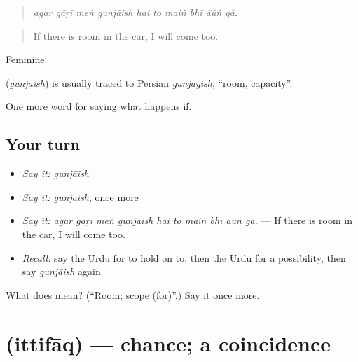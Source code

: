 \begin{quote}
         
\end{quote}

\begin{quote}
\emph{agar gāṛī meṅ gunjāish hai to maiṅ bhī āūṅ gā.}
\end{quote}

\begin{quote}
If there is room in the car, I will come too.
\end{quote}

Feminine.

\begin{cousinweb}
\textbf{} (\emph{gunjāish}) is usually traced to Persian \emph{gunjāyish}, \textquotedblleft{}room, capacity\textquotedblright{}.
\end{cousinweb}

\begin{grammarlens}[title={What you've built}]
One more word for saying what happens if.
\end{grammarlens}

\subsection*{Your turn}
\begin{itemize}
\raggedright
  \item \emph{Say it:} \emph{gunjāish}
  \item \emph{Say it:} \emph{gunjāish}, once more
  \item \emph{Say it:} \emph{agar gāṛī meṅ gunjāish hai to maiṅ bhī āūṅ gā.} — If there is room in the car, I will come too.
  \item \emph{Recall:} say the Urdu for to hold on to, then the Urdu for a possibility, then say \emph{gunjāish} again
\end{itemize}

\begin{tcolorbox}[breakable,colback=teal!4,colframe=teal!35!black,title={Before you move on}]
What does  mean? (\textquotedblleft{}Room; scope (for)\textquotedblright{}.) Say it once more.
\end{tcolorbox}
\section[\texorpdfstring{\ur{اتفاق} (ittifāq)}{اتفاق (ittifāq)}]{ (ittifāq) — chance; a coincidence}

